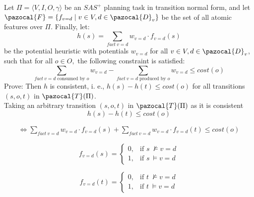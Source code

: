 \documentclass[11pt,a4paper]{article}
\begin{document}
Let $\Pi = \langle V, I, O, \gamma \rangle$ be an $SAS^+$ planning task in transition normal form, and let $\pazocal{F} = \{f_{v=d} \mid v \in V, d \in \pazocal{D}_v\}$ be the set of all atomic features over $\Pi$. Finally, let:
\[h(s) = \sum_{fact\:v=d} w_{v=d} \cdot f_{v=d}(s) \]
be the potential heuristic with potentials $w_{v=d}$ for all $v \in V , d \in \pazocal{D}_v$, such that for all $o \in O,$ the following constraint is satisfied:
\[\sum_{fact\:v=d \text{ consumed by } o} w_{v=d} - \sum_{fact\:v=d \text{ produced by } o} w_{v=d} \leq cost(o)\]
Prove: Then $h$ is consistent, i. e., $h(s) - h(t) \leq cost(o)$ for all transitions $(s, o, t)$ in $\pazocal{T}(\Pi)$.\\

Taking an arbitrary transition $(s, o, t)$ in $\pazocal{T}(\Pi)$ as it is consistent\\

\[		h(s) - h(t) \leq cost(o) \]

\begin{equation*}
	\begin{aligned}
		\iff \sum_{fact\:v=d} w_{v=d} \cdot f_{v=d}(s) + \sum_{fact\:v=d} w_{v=d} \cdot f_{v=d}(t) \leq cost(o)
	\end{aligned}
\end{equation*}

\begin{multicols}{2}
	\begin{equation*}
		f_{v=d}(s)=
		\begin{cases}
		0, & \text{if } s\: \not\models v=d \\
		1, & \text{if } s\: \models v=d
		\end{cases}
	\end{equation*}

	\begin{equation*}
		f_{v=d}(t)=
		\begin{cases}
		0, & \text{if } t\: \not\models v=d \\
		1, & \text{if } t\: \models v=d
		\end{cases}
	\end{equation*}
\end{multicols}
\end{document}

